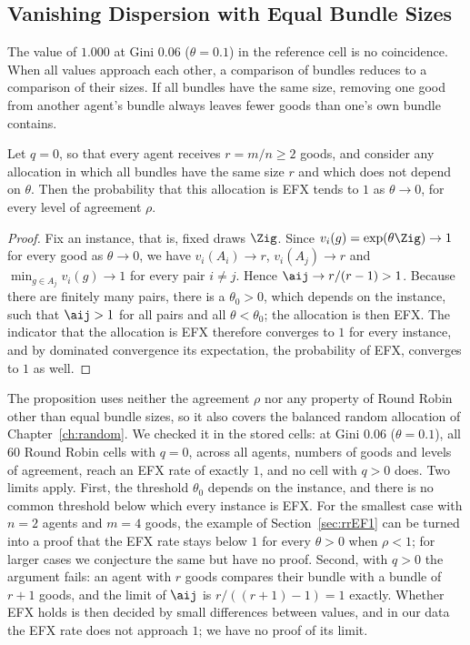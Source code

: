 \subsection{Vanishing Dispersion with Equal Bundle Sizes}\label{sec:dispersion-limit}

The value of $1.000$ at Gini $0.06$ ($\theta=0.1$) in the reference cell is no coincidence. When
all values approach each other, a comparison of bundles reduces to a comparison of their sizes.
If all bundles have the same size, removing one good from another agent's bundle always leaves
fewer goods than one's own bundle contains.

\begin{proposition}\label{prop:theta-limit}
Let $q=0$, so that every agent receives $r=m/n\geq2$ goods, and consider any allocation in which
all bundles have the same size $r$ and which does not depend on $\theta$. Then the probability
that this allocation is EFX tends to $1$ as $\theta\to0$, for every level of agreement $\rho$.
\end{proposition}

\begin{proof}
Fix an instance, that is, fixed draws $\Zig$. Since $v_i(g)=\exp(\theta\Zig)\to1$ for every good
as $\theta\to0$, we have $v_i(A_i)\to r$, $v_i(A_j)\to r$ and
$\min_{g\in A_j}v_i(g)\to1$ for every pair $i\neq j$. Hence $\aij\to r/(r-1)>1$. Because there
are finitely many pairs, there is a $\theta_0>0$, which depends on the instance, such that
$\aij>1$ for all pairs and all $\theta<\theta_0$; the allocation is then EFX. The indicator that
the allocation is EFX therefore converges to $1$ for every instance, and by dominated convergence
its expectation, the probability of EFX, converges to $1$ as well.
\end{proof}

The proposition uses neither the agreement $\rho$ nor any property of Round Robin other than equal
bundle sizes, so it also covers the balanced random allocation of Chapter~\ref{ch:random}. We
checked it in the stored cells: at Gini $0.06$ ($\theta=0.1$), all $60$ Round Robin cells with
$q=0$, across all agents, numbers of goods and levels of agreement, reach an EFX rate of exactly
$1$, and no cell with $q>0$ does. Two limits apply. First, the threshold $\theta_0$ depends on the
instance, and there is no common threshold below which every instance is EFX. For the smallest
case with $n=2$ agents and $m=4$ goods, the example of Section~\ref{sec:rrEF1} can be turned into a
proof that the EFX rate stays below $1$ for every $\theta>0$ when $\rho<1$; for larger cases we
conjecture the same but have no proof. Second, with $q>0$ the argument fails: an agent with $r$
goods compares their bundle with a bundle of $r+1$ goods, and the limit of $\aij$ is
$r/((r+1)-1)=1$ exactly. Whether EFX holds is then decided by small differences between values,
and in our data the EFX rate does not approach $1$; we have no proof of its limit.

